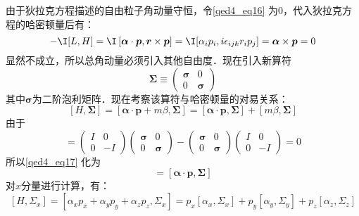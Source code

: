 由于狄拉克方程描述的自由粒子角动量守恒，令\autoref{qed4_eq16} 为0，代入狄拉克方程的哈密顿量后有：
\begin{equation}\label{qed4_eq18}
- \I[L,H]=
 \I\left[\boldsymbol{\alpha} \cdot \boldsymbol{p},\boldsymbol{r} \times \boldsymbol{p}\right]
= \I[\alpha_ip_i,i\epsilon_{ijk}r_ip_j]=\boldsymbol{\alpha} \times \boldsymbol{p}=0
\end{equation}
显然不成立，所以总角动量必须引入其他自由度．现在引入新算符
\begin{equation}
\boldsymbol{\Sigma} \equiv\left(\begin{array}{cc}
\boldsymbol{\sigma} & 0 \\
0 & \boldsymbol{\sigma}
\end{array}\right)
\end{equation}
其中$\boldsymbol{\sigma}$为二阶泡利矩阵．现在考察该算符与哈密顿量的对易关系：
\begin{equation}\label{qed4_eq17}
[H, \mathbf{\Sigma}]=[\boldsymbol{\alpha} \cdot \boldsymbol{p}+m\beta , \boldsymbol{\Sigma}]=[\boldsymbol{\alpha} \cdot \boldsymbol{p}, \boldsymbol{\Sigma}]+[m\beta , \boldsymbol{\Sigma}]
\end{equation}
由于\begin{equation}
[\beta m, \mathbf{\Sigma}]=\left(\begin{array}{cc}
I & 0 \\
0 & -I
\end{array}\right)\left(\begin{array}{cc}
\boldsymbol{\sigma} & 0 \\
0 & \boldsymbol{\sigma}
\end{array}\right)-\left(\begin{array}{cc}
\boldsymbol{\sigma} & 0 \\
0 & \boldsymbol{\sigma}
\end{array}\right)\left(\begin{array}{cc}
I & 0 \\
0 & -I
\end{array}\right)=0
\end{equation}
所以\autoref{qed4_eq17} 化为
\begin{equation}
[H, \Sigma]=[\boldsymbol{\alpha} \cdot \boldsymbol{p}, \boldsymbol{\Sigma}]
\end{equation}
对$x$分量进行计算，有：
\begin{equation}
\left[H, \Sigma_{x}\right]=\left[\alpha_{x} p_{x}+\alpha_{y} p_{y}+\alpha_{z} p_{z}, \Sigma_{x}\right]=p_{x}\left[\alpha_{x}, \Sigma_{x}\right]+p_{y}\left[\alpha_{y}, \Sigma_{y}\right]+p_{z}\left[\alpha_{z}, \Sigma_{z}\right]
\end{equation}

